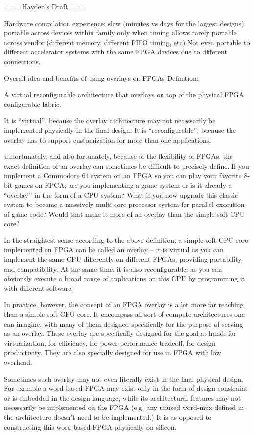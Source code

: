 === Hayden's Draft ===

Hardware compilation experience:
slow (minutes vs days for the largest designs)
portable across devices within family only when timing allows
rarely portable across vendor (different memory, different FIFO timing, etc)
Not even portable to different accelerator systems with the same FPGA devices due to different connections.


Overall idea and benefits of using overlays on FPGAs
Definition:


A virtual reconfigurable architecture that overlays on top of the physical FPGA configurable fabric.
	

It is ``virtual'', because the overlay architecture may not necessarily be implemented physically in the final design.  It is ``reconfigurable'', because the overlay has to support customization for more than one applications.


Unfortunately, and also fortunately, because of the flexibility of FPGAs, the exact definition of an overlay can sometimes be difficult to precisely define.  If you implement a Commodore 64 system on an FPGA so you can play your favorite 8-bit games on FPGA, are you implementing a game system or is it already a ``overlay’’ in the form of a CPU system?
What if you now upgrade this classic system to become a massively multi-core processor system for parallel execution of game code?  Would that make it more of an overlay than the simple soft CPU core?


In the straightest sense according to the above definition, a simple soft CPU core implemented on FPGA can be called an overlay -- it is virtual as you can implement the same CPU differently on different FPGAs, providing portability and compatibility.  At the same time, it is also reconfigurable, as you can obviously execute a broad range of applications on this CPU by programming it with different software.


In practice, however, the concept of an FPGA overlay is a lot more far reaching than a simple soft CPU core.  It encompass all sort of compute architectures one can imagine, with many of them designed specifically for the purpose of serving as an overlay.  These overlay are specifically designed for the goal at hand: for virtualization, for efficiency, for power-performance tradeoff, for design productivity.  They are also specially designed for use in FPGA with low overhead.


Sometimes such overlay may not even literally exist in the final physical design.  For example a word-based FPGA may exist only in the form of design constraint or is embedded in the design language, while its architectural features may not necessarily be implemented on the FPGA (e.g. any unused word-mux defined in the architecture doesn't need to be implemented.)  It is as opposed to constructing this word-based FPGA physically on silicon.


